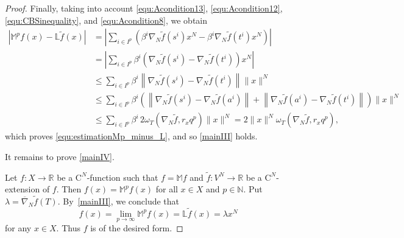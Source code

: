 \documentclass{amsart}
\theoremstyle{plain}%
\theoremstyle{definition}
\theoremstyle{remark}
\begin{document}
\begin{proof}
Finally, taking into account \eqref{equ:Acondition13}, \eqref{equ:Acondition12},  \eqref{equ:CBSinequality}, and \eqref{equ:Acondition8}, we obtain
\begin{align*}
|\mathbb{M}^pf(x)-\mathbb{L}\widetilde{f}(x)|&=
\left|\sum_{i\in I^p}\left(\beta^i \nabla\!_N\widetilde{f}(s^i) x^N
-\beta^i \nabla\!_N\widetilde{f}(t^i) x^N\right)\right|\\
&=\left|\sum_{i\in I^p}\beta^i\left(\nabla\!_N\widetilde{f}(s^i)
-\nabla\!_N\widetilde{f}(t^i)\right) x^N\right|\\
&\le \sum_{i\in I^p}\beta^i\left\|\nabla\!_N\widetilde{f}(s^i)
-\nabla\!_N\widetilde{f}(t^i)\right\|\|x\|^N\\
&\le \sum_{i\in I^p}\beta^i\left(\left\|\nabla\!_N\widetilde{f}(s^i)
-\nabla\!_N\widetilde{f}(a^i)\right\|+\left\|\nabla\!_N\widetilde{f}(a^i)- \nabla\!_N\widetilde{f}(t^i)\right\|\right)\|x\|^N\\
&\le \sum_{i\in I^p}\beta^i\,2\omega_T(\nabla_N\widetilde{f},r_xq^p)\|x\|^N
=2\|x\|^N\omega_T(\nabla_N\widetilde{f},r_xq^p),
\end{align*}
which proves \eqref{equ:estimationMp_minus_L}, and so \ref{mainIII} holds.

It remains to prove \ref{mainIV}. 

Let $f\colon X\to \mathbb{R}$ be a $\mathrm{C}^N$\nobreakdash-function such that  $f=\mathbb{M}f$ and $\widetilde{f}\colon V^N\to \mathbb{R}$ be a $\mathrm{C}^N$\nobreakdash-extension of $f$. Then $f(x)=\mathbb{M}^pf(x)$ for all $x\in X$ and $p\in\mathbb{N}$.
Put $\lambda=\overline{\nabla}\!_N\widetilde f(T)$. By~\ref{mainIII}, we conclude that
\begin{equation*}
f(x)=\lim_{p\to\infty}\mathbb{M}^p f(x)=\mathbb{L}\widetilde{f}(x)=\lambda x^N
\end{equation*}
for any $x\in X$. Thus $f$ is of the desired form.
	

\end{proof}
\end{document}

